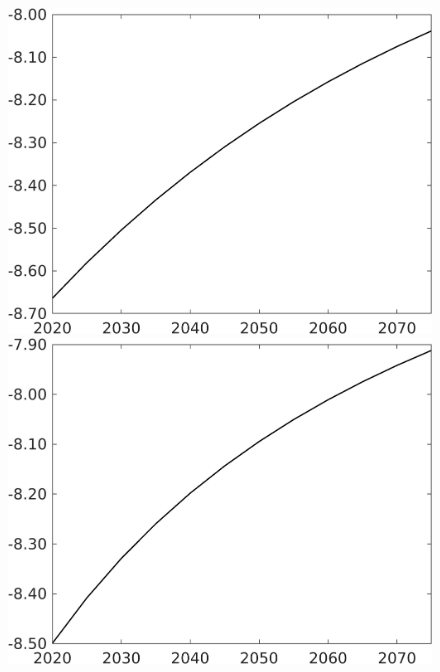 \begin{figure}[h!!]
\begin{minipage}[]{0.32\textwidth}
	\end{minipage}		
	\begin{minipage}[]{0.32\textwidth}
		\includegraphics[width=1\textwidth]{../../codding_model/own_basedOnFried/optimalPol_010922_revision/figures/all_13Sept22/CompTaul_LFBAUPer_Reg0_wsg_spillover0_nsk1_xgr0_sep1_countec0_GovRev1_etaa0.79.png}
	\end{minipage}		
	\begin{minipage}[]{0.32\textwidth}
		\includegraphics[width=1\textwidth]{../../codding_model/own_basedOnFried/optimalPol_010922_revision/figures/all_13Sept22/CompTaul_LFBAUPer_Reg0_wsn_spillover0_nsk1_xgr0_sep1_countec0_GovRev1_etaa0.79.png}
	\end{minipage}	
\end{figure}



